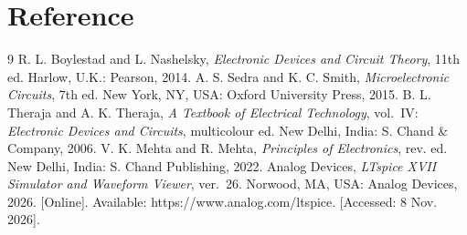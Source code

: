 \documentclass[12pt,a4paper]{article}
\begin{document}
	\section{Reference}
	\renewcommand{\refname}{} %
	\begin{thebibliography}{9}
		 R. L. Boylestad and L. Nashelsky,
		\textit{Electronic Devices and Circuit Theory}, 11th ed.
		Harlow, U.K.: Pearson, 2014.
		 A. S. Sedra and K. C. Smith,
		\textit{Microelectronic Circuits}, 7th ed.
		New York, NY, USA: Oxford University Press, 2015.
		 B. L. Theraja and A. K. Theraja,
		\textit{A Textbook of Electrical Technology}, vol.~IV:
		\textit{Electronic Devices and Circuits}, multicolour ed.
		New Delhi, India: S. Chand \& Company, 2006.
		 V. K. Mehta and R. Mehta,
		\textit{Principles of Electronics}, rev. ed.
		New Delhi, India: S. Chand Publishing, 2022.
		 Analog Devices,
		\textit{LTspice XVII Simulator and Waveform Viewer}, ver.~26.
		Norwood, MA, USA: Analog Devices, 2026.
		[Online]. Available: https://www.analog.com/ltspice. [Accessed: 8 Nov. 2026].
	\end{thebibliography}
\end{document}
